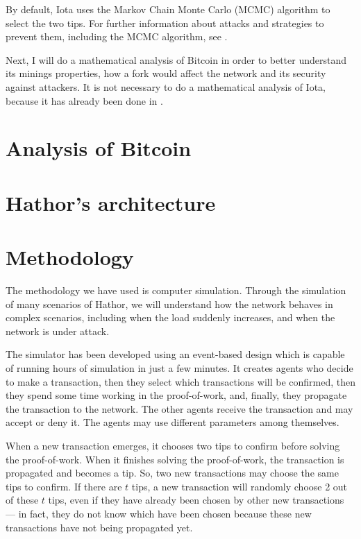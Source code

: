 By default, Iota uses the Markov Chain Monte Carlo (MCMC) algorithm to select the two tips. For further information about attacks and strategies to prevent them, including the MCMC algorithm, see \cite{tangle2016}.

Next, I will do a mathematical analysis of Bitcoin in order to better understand its minings properties, how a fork would affect the network and its security against attackers. It is not necessary to do a mathematical analysis of Iota, because it has already been done in \citet{tangle2016}.


\chapter{Analysis of Bitcoin}



\chapter{Hathor's architecture}



\chapter{Methodology}

The methodology we have used is computer simulation. Through the simulation of many scenarios of Hathor, we will understand how the network behaves in complex scenarios, including when the load suddenly increases, and when the network is under attack.

The simulator has been developed using an event-based design which is capable of running hours of simulation in just a few minutes. It creates agents who decide to make a transaction, then they select which transactions will be confirmed, then they spend some time working in the proof-of-work, and, finally, they propagate the transaction to the network. The other agents receive the transaction and may accept or deny it. The agents may use different parameters among themselves.

When a new transaction emerges, it chooses two tips to confirm before solving the proof-of-work. When it finishes solving the proof-of-work, the transaction is propagated and becomes a tip. So, two new transactions may choose the same tips to confirm. If there are $t$ tips, a new transaction will randomly choose 2 out of these $t$ tips, even if they have already been chosen by other new transactions --- in fact, they do not know which have been chosen because these new transactions have not being propagated yet.

